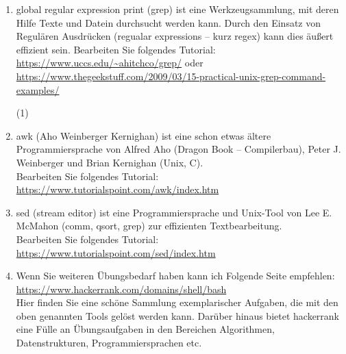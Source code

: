 \documentclass[paper=a4,fontsize=11pt]{scrartcl}%
\numberwithin{equation}{section}
\begin{document}
\begin{enumerate}
	\item global regular expression print (grep) ist eine Werkzeugsammlung, mit deren Hilfe Texte und Datein durchsucht werden kann. Durch den Einsatz von Regulären Ausdrücken (regualar expressions -- kurz regex) kann dies äußert effizient sein. Bearbeiten Sie folgendes Tutorial: \url{https://www.uccs.edu/~ahitchco/grep/} oder \url{https://www.thegeekstuff.com/2009/03/15-practical-unix-grep-command-examples/}
	\begin{tasks}(1)
		\task~
	\end{tasks}
	\item awk (Aho Weinberger Kernighan) ist eine schon etwas ältere Programmiersprache von Alfred Aho (Dragon Book -- Compilerbau), Peter J. Weinberger und Brian Kernighan (Unix, C).\\
	Bearbeiten Sie folgendes Tutorial: \url{https://www.tutorialspoint.com/awk/index.htm}
	\item sed (stream editor) ist eine Programmiersprache und Unix-Tool von Lee E. McMahon (comm, qsort, grep) zur effizienten Textbearbeitung.\\
	Bearbeiten Sie folgendes Tutorial: \url{https://www.tutorialspoint.com/sed/index.htm}
	\item Wenn Sie weiteren Übungsbedarf haben kann ich Folgende Seite empfehlen:\\
	\url{https://www.hackerrank.com/domains/shell/bash}\\
	Hier finden Sie eine schöne Sammlung exemplarischer Aufgaben, die mit den oben genannten Tools gelöst werden kann. Darüber hinaus bietet hackerrank eine Fülle an Übungsaufgaben in den Bereichen Algorithmen, Datenstrukturen, Programmiersprachen etc.
\end{enumerate} 
\end{document}
